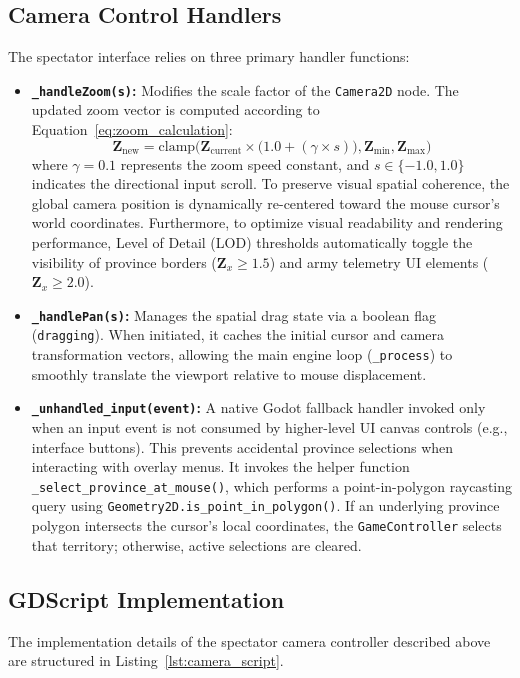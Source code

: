 \subsection{Camera Control Handlers}
The spectator interface relies on three primary handler functions:
\begin{itemize}
    \item \textbf{\texttt{\_handleZoom(s)}:} Modifies the scale factor of the \texttt{Camera2D} node. The updated zoom vector is computed according to Equation~\ref{eq:zoom_calculation}:
    \begin{equation}
        \label{eq:zoom_calculation}
        \mathbf{Z}_{\text{new}} = \text{clamp}\Big(\mathbf{Z}_{\text{current}} \times \big(1.0 + (\gamma \times s)\big), \mathbf{Z}_{\text{min}}, \mathbf{Z}_{\text{max}}\Big)
    \end{equation}
    where $\gamma = 0.1$ represents the zoom speed constant, and $s \in \{-1.0, 1.0\}$ indicates the directional input scroll. To preserve visual spatial coherence, the global camera position is dynamically re-centered toward the mouse cursor's world coordinates. Furthermore, to optimize visual readability and rendering performance, Level of Detail (LOD) thresholds automatically toggle the visibility of province borders ($\mathbf{Z}_{x} \ge 1.5$) and army telemetry UI elements ($\mathbf{Z}_{x} \ge 2.0$).
    
    \item \textbf{\texttt{\_handlePan(s)}:} Manages the spatial drag state via a boolean flag (\texttt{dragging}). When initiated, it caches the initial cursor and camera transformation vectors, allowing the main engine loop (\texttt{\_process}) to smoothly translate the viewport relative to mouse displacement.
    
    \item \textbf{\texttt{\_unhandled\_input(event)}:} A native Godot fallback handler invoked only when an input event is not consumed by higher-level UI canvas controls (e.g., interface buttons). This prevents accidental province selections when interacting with overlay menus. It invokes the helper function \texttt{\_select\_province\_at\_mouse()}, which performs a point-in-polygon raycasting query using \texttt{Geometry2D.is\_point\_in\_polygon()}. If an underlying province polygon intersects the cursor's local coordinates, the \texttt{GameController} selects that territory; otherwise, active selections are cleared.
\end{itemize}

\subsection{GDScript Implementation}
The implementation details of the spectator camera controller described above are structured in Listing~\ref{lst:camera_script}.

